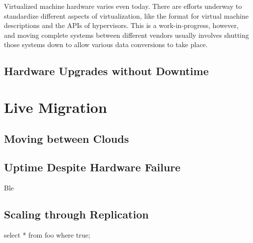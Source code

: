 \documentclass{scrartcl}
\begin{document}
Virtualized machine hardware varies even today. There are efforts
underway\cite{cloudstandard} to standardize different aspects of
virtualization, like the format for virtual machine descriptions and
the APIs of hypervisors. This is a work-in-progress, however, and
moving complete systems between different vendors usually involves
shutting those systems down to allow various data conversions to take
place.

\subsection{Hardware Upgrades without Downtime}

\section{Live Migration}
\label{sec:livemigration}

\blindtext

\subsection{Moving between Clouds}
\label{sec:movclouds}

\blindtext

\ParSep

\blindtext

\subsection{Uptime Despite Hardware Failure}
\label{sec:hardfail}

Ble

\subsection{Scaling through Replication}

\begin{code}[language=SQL]
select  * from foo where true;
\end{code}
\blinddocument

%
\end{document}
